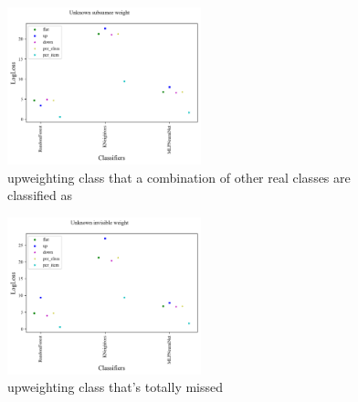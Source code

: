 \begin{figure}
	\begin{center}
		\includegraphics[width=0.5\textwidth]{./fig/systematic_Unknown_subsumee.png}
		\caption{upweighting class that a combination of other real classes are classified as}
		\label{fig:systematic_subsumee}
	\end{center}
\end{figure}

\begin{figure}
	\begin{center}
		\includegraphics[width=0.5\textwidth]{./fig/systematic_Unknown_invisible.png}
		\caption{upweighting class that's totally missed}
		\label{fig:systematic_invisible}
	\end{center}
\end{figure}
